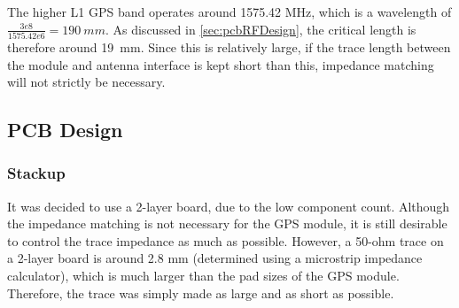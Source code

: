 The higher L1 GPS band operates around 1575.42 MHz, which is a wavelength of $\frac{3e8}{1575.42e6} = \SI{190}{mm}$. As discussed in \ref{sec:pcbRFDesign}, the critical length is therefore around \SI{19}{mm}. Since this is relatively large, if the trace length between the module and antenna interface is kept short than this, impedance matching will not strictly be necessary.

\subsection{PCB Design}
\subsubsection{Stackup}
It was decided to use a 2-layer board, due to the low component count. Although the impedance matching is not necessary for the GPS module, it is still desirable to control the trace impedance as much as possible. However, a 50-ohm trace on a 2-layer board is around 2.8 mm (determined using a microstrip impedance calculator), which is much larger than the pad sizes of the GPS module. Therefore, the trace was simply made as large and as short as possible.

